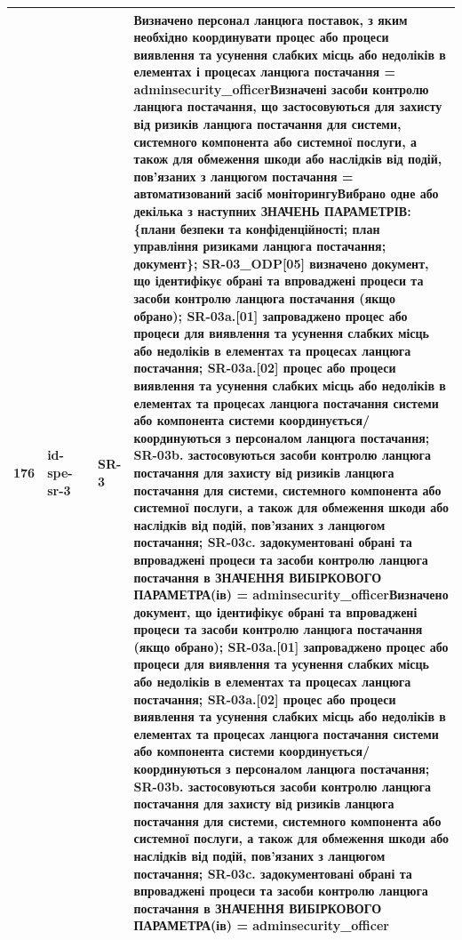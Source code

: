 \documentclass[10pt]{article}
\begin{document}
\begin{longtable}{|c|>{\raggedright\arraybackslash}p{2.5cm}|>{\raggedright\arraybackslash}p{4.5cm}|>{\raggedright\arraybackslash}p{3cm}|>{\raggedright\arraybackslash}p{4.5cm}|}
176 & id-spe-sr-3 &  & SR-3 & Визначено персонал ланцюга поставок, з яким необхідно координувати процес або процеси виявлення та усунення слабких місць або недоліків в елементах і процесах ланцюга постачання = \textbf{adminsecurity\_\allowbreak{}officer}\newline Визначені засоби контролю ланцюга постачання, що застосовуються для захисту від ризиків ланцюга постачання для системи, системного компонента або системної послуги, а також для обмеження шкоди або наслідків від подій, пов'язаних з ланцюгом постачання = \textbf{автоматизований засіб моніторингу}\newline Вибрано одне або декілька з наступних ЗНАЧЕНЬ ПАРАМЕТРІВ: \{плани безпеки та конфіденційності; план управління ризиками ланцюга постачання; документ\}; SR-03\_\allowbreak{}ODP[05] визначено документ, що ідентифікує обрані та впроваджені процеси та засоби контролю ланцюга постачання (якщо обрано); SR-03a.[01] запроваджено процес або процеси для виявлення та усунення слабких місць або недоліків в елементах та процесах ланцюга постачання; SR-03a.[02] процес або процеси виявлення та усунення слабких місць або недоліків в елементах та процесах ланцюга постачання системи або компонента системи координується/координуються з персоналом ланцюга постачання; SR-03b. застосовуються засоби контролю ланцюга постачання для захисту від ризиків ланцюга постачання для системи, системного компонента або системної послуги, а також для обмеження шкоди або наслідків від подій, пов'язаних з ланцюгом постачання; SR-03c. задокументовані обрані та впроваджені процеси та засоби контролю ланцюга постачання в ЗНАЧЕННЯ ВИБІРКОВОГО ПАРАМЕТРА(ів) = \textbf{adminsecurity\_\allowbreak{}officer}\newline Визначено документ, що ідентифікує обрані та впроваджені процеси та засоби контролю ланцюга постачання (якщо обрано); SR-03a.[01] запроваджено процес або процеси для виявлення та усунення слабких місць або недоліків в елементах та процесах ланцюга постачання; SR-03a.[02] процес або процеси виявлення та усунення слабких місць або недоліків в елементах та процесах ланцюга постачання системи або компонента системи координується/координуються з персоналом ланцюга постачання; SR-03b. застосовуються засоби контролю ланцюга постачання для захисту від ризиків ланцюга постачання для системи, системного компонента або системної послуги, а також для обмеження шкоди або наслідків від подій, пов'язаних з ланцюгом постачання; SR-03c. задокументовані обрані та впроваджені процеси та засоби контролю ланцюга постачання в ЗНАЧЕННЯ ВИБІРКОВОГО ПАРАМЕТРА(ів) = \textbf{adminsecurity\_\allowbreak{}officer} \\ \hline

\end{longtable}
\end{document}
